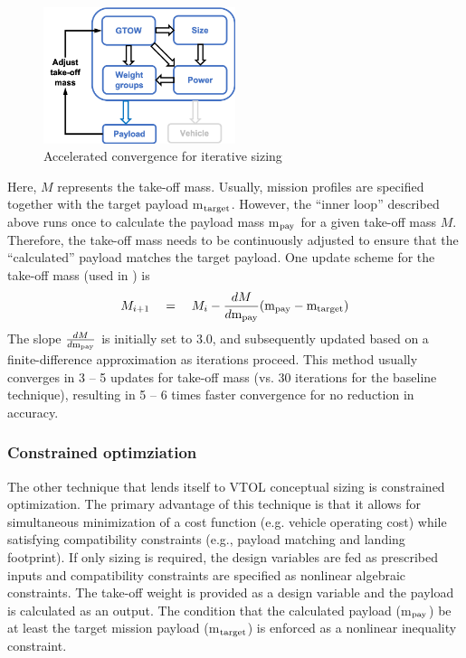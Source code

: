 \begin{figure}
\begin{center}
\includegraphics[width=0.5\textwidth]{images/accel_conv.png}
\caption{Accelerated convergence for iterative sizing}
\label{fig:accel_conv}
\end{center}
\end{figure}

Here, $M$ represents the take-off mass. Usually, mission profiles are specified together with the target payload m$_{\rm target}$. However, the ``inner loop'' described above runs once to calculate the payload mass m$_{\rm pay}$ for a given take-off mass $M$. Therefore, the take-off mass needs to be continuously adjusted to ensure that the ``calculated'' payload matches the target payload. One update scheme for the take-off mass (used in \hydra) is 
\begin{equation}
M_{i+1} \quad = \quad M_i - \frac{dM}{d\textrm{m}_{\rm pay}} (\textrm{m}_{\rm pay} - \textrm{m}_{\rm target})
\end{equation}
The slope $\frac{dM}{d\textrm{m}_{\rm pay}}$ is initially set to 3.0, and subsequently updated based on a finite-difference approximation as iterations proceed. This method usually converges in 3 -- 5 updates for take-off mass (vs. 30 iterations for the baseline technique), resulting in 5 -- 6 times faster convergence for no reduction in accuracy.

\subsubsection{Constrained optimziation}
The other technique that lends itself to VTOL conceptual sizing is constrained optimization. The primary advantage of this technique is that it allows for simultaneous minimization of a cost function (e.g. vehicle operating cost) while satisfying compatibility constraints (e.g., payload matching and landing footprint). If only sizing is required, the design variables are fed as prescribed inputs and compatibility constraints are specified as nonlinear algebraic constraints. The take-off weight is provided as a design variable and the payload is calculated as an output. The condition that the calculated payload (m$_{\rm pay}$) be at least the target mission payload (m$_{\rm target}$) is enforced as a nonlinear inequality constraint. 

